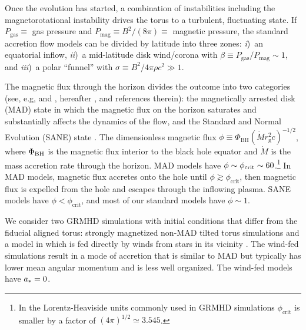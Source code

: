 Once the evolution has started, a combination of instabilities including the magnetorotational instability \citep[MRI][]{1992ApJ...400..610B} drives the torus to a turbulent, fluctuating state.
If $P_\mathrm{gas} \equiv$ gas pressure and $P_\mathrm{mag} \equiv B^2 / (8\pi) \equiv$ magnetic pressure, the standard accretion flow models can be divided by latitude into three zones:
\emph{i})~an equatorial inflow,
\emph{ii})~a mid-latitude disk wind/corona with  $\beta  \equiv P_\mathrm{gas} / P_\mathrm{mag} \sim 1$, and
\emph{iii})~a polar ``funnel'' with $\sigma \equiv B^2/4\pi \rho c^2 \gg 1$.

The magnetic flux through the horizon divides the outcome into two categories (see, e.g, \citealt{M87PaperV} and \citealt{M87PaperVIII}, hereafter , and references therein): the magnetically arrested disk (MAD) state \citep[e.g.,][]{1974Ap&SS..28...45B, 2003ApJ...592.1042I, 2003PASJ...55L..69N, 2011MNRAS.418L..79T} in which the magnetic flux on the horizon saturates and substantially affects the dynamics of the flow, and the Standard and Normal Evolution (SANE) state \citep[e.g.,][]{2003ApJ...589..444G, 2003ApJ...599.1238D, 2012MNRAS.426.3241N}.
The dimensionless magnetic flux $\phi \equiv \Phi_{\mathrm{BH}} (\dot{M} r_\mathrm{g}^2 c)^{-1/2}$, where $\Phi_{\rm BH}$ is the magnetic flux interior to the black hole equator and $\dot{M}$ is the mass accretion rate through the horizon.
MAD models have $\phi \sim \phi_{\rm crit} \sim 60$.\footnote{In the Lorentz-Heaviside units commonly used in GRMHD simulations $\phi_\mathrm{crit}$ is smaller by a factor of $(4\pi)^{1/2} \simeq 3.545$.}
In MAD models, magnetic flux accretes onto the hole until $\phi \gtrsim \phi_\mathrm{crit}$, then magnetic flux is expelled from the hole and escapes through the inflowing plasma.  SANE models have $\phi < \phi_\mathrm{crit}$, and most of our standard models have $\phi \sim 1$.

We consider two GRMHD simulations with initial conditions that differ from the fiducial aligned torus: strongly magnetized non-MAD tilted torus simulations \citep{Liska2018, Chatterjee2020} and a model in which \sgra is fed directly by winds from stars in its vicinity \citep{2020ApJ...896L...6R}.
The wind-fed simulations result in a mode of accretion that is similar to MAD but typically has lower mean angular momentum and is less well organized.
The wind-fed models have $a_* = 0$.

